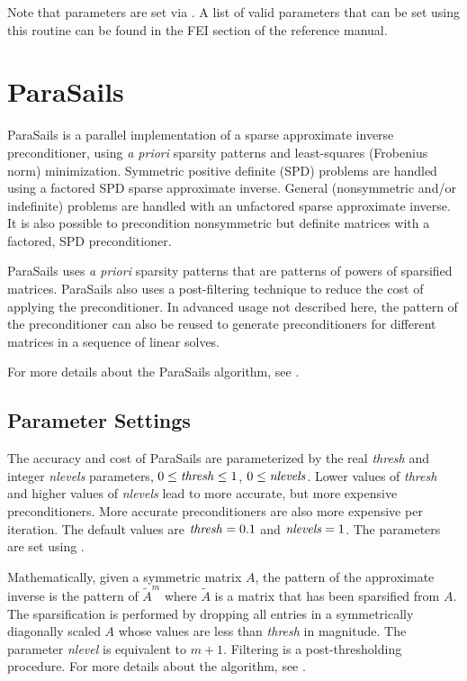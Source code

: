 \noindent
Note that parameters are set via . A list of
valid parameters that can be set using this routine can be found in the
FEI section of the reference manual.



\section{ParaSails}

ParaSails is a parallel implementation of a sparse approximate inverse
preconditioner, using {\em a priori} sparsity patterns and least-squares
(Frobenius norm) minimization.  Symmetric positive definite (SPD) problems
are handled using a factored SPD sparse approximate inverse.  General
(nonsymmetric and/or indefinite) problems are handled with an
unfactored sparse approximate inverse.  It is also possible to
precondition nonsymmetric but definite matrices with a factored, SPD
preconditioner.

ParaSails uses {\em a priori} sparsity patterns that are patterns of powers
of sparsified matrices.  ParaSails also uses a post-filtering technique
to reduce the cost of applying the preconditioner.  
In advanced usage not described here, the pattern of the
preconditioner can also be reused to generate preconditioners for different
matrices in a sequence of linear solves.

For more details about the ParaSails algorithm, see \cite{EChow_2000}.


\subsection{Parameter Settings}

The accuracy and cost of ParaSails are parameterized by the real {\em thresh}
and integer {\em nlevels} parameters,
$0 \le {\it thresh} \le 1$, $0 \le {\it nlevels}$.
Lower values of {\em thresh}
and higher values of {\em nlevels} lead to more accurate, but more expensive
preconditioners.  More accurate preconditioners are also more expensive
per iteration.  The default values are ${\it thresh} = 0.1$
and ${\it nlevels} = 1$.  The parameters are set using
.

Mathematically, given a symmetric matrix $A$, the pattern of the
approximate inverse is the pattern of $\tilde{A}^m$ where $\tilde{A}$
is a matrix that has been sparsified from $A$.  The sparsification
is performed by dropping all entries in a symmetrically diagonally scaled $A$
whose values are less than {\em thresh} in magnitude.  The parameter
{\em nlevel} is equivalent to $m+1$.
Filtering is a post-thresholding procedure.
For more details about the algorithm, see \cite{EChow_2000}.

